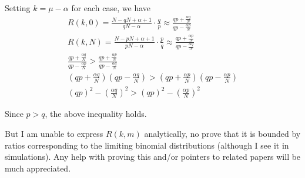 \documentclass[11pt,draft]{article}
\begin{document}
Setting  $k=\mu - \alpha$ for each case, we have
\begin{align}
R(k,0) =  \frac{N-qN + \alpha+1}{qN-\alpha} \cdot \frac{q}{p} \approx \frac{qp + \frac{\alpha q}{N}}{qp - \frac{\alpha p}{N}}\\
R(k,N) = \frac{N-pN + \alpha+1}{pN-\alpha} \cdot \frac{p}{q} \approx \frac{qp + \frac{\alpha p}{N}}{qp - \frac{\alpha q}{N}}\\
\frac{qp + \frac{\alpha q}{N}}{qp - \frac{\alpha p}{N}} >  \frac{qp + \frac{\alpha p}{N}}{qp - \frac{\alpha q}{N}} \\
(qp + \frac{\alpha q}{N})(qp - \frac{\alpha q}{N}) > (qp + \frac{\alpha p}{N})(qp - \frac{\alpha p}{N}) \\
(qp)^2 - \left ( \frac{\alpha q}{N} \right )^2 > (qp)^2 - \left ( \frac{\alpha p}{N} \right )^2 
\end{align}

Since $p>q$, the above inequality holds.

But I am unable to express $R(k,m)$ analytically, no prove that it is bounded by ratios corresponding to the limiting binomial distributions (although I see it in simulations).
Any help with proving this and/or pointers to related papers will be much appreciated.
\end{document}
